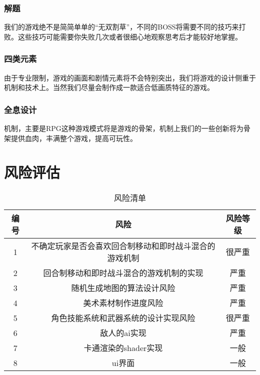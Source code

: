 ﻿\documentclass{article}
\begin{document}
\subsubsection{解题}
我们的游戏绝不是简简单单的“无双割草”，不同的BOSS将需要不同的技巧来打败。这些技巧可能需要你失败几次或者很细心地观察思考后才能较好地掌握。
\subsubsection{四类元素}
由于专业限制，游戏的画面和剧情元素将不会特别突出，我们将游戏的设计侧重于机制和技术上。当然我们尽量会制作成一款适合低画质特征的游戏。
\subsubsection{全息设计}
机制，主要是RPG这种游戏模式将是游戏的骨架，机制上我们的一些创新将为骨架提供血肉，丰满整个游戏，提高可玩性。
\section{风险评估}
\begin{table}[htbp]
\centering
\caption{风险清单}
\begin{tabular}{|c|c|c|}
	\hline
	编号 & 风险 & 风险等级 \\
	\hline
	1 & 不确定玩家是否会喜欢回合制移动和即时战斗混合的游戏机制 & 很严重 \\
	\hline
	2 & 回合制移动和即时战斗混合的游戏机制的实现 & 严重 \\
	\hline
	3 & 随机生成地图的算法设计风险 & 严重 \\
	\hline
	4 & 美术素材制作进度风险 & 严重 \\
	\hline
	5 & 角色技能系统和武器系统的设计实现风险 & 很严重 \\
	\hline
	6 & 敌人的ai实现 & 严重 \\
	\hline
	7 & 卡通渲染的shader实现 & 一般 \\
	\hline
	8 & ui界面 & 一般 \\
	\hline
\end{tabular}
\end{table}
\end{document}
